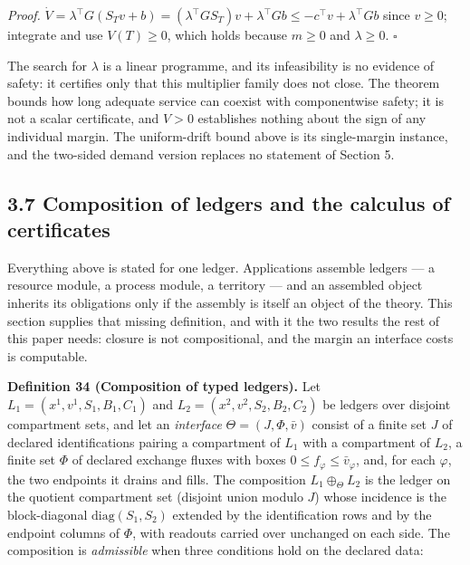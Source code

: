 \documentclass[11pt]{article}
\begin{document}
\emph{Proof.} \(\dot V=\allowbreak{}\lambda^{\top}G(S_Tv+\allowbreak{}b)=\allowbreak{}(\lambda^{\top}GS_T)v+\allowbreak{}\lambda^{\top}Gb\le -c^{\top}v+\allowbreak{}\lambda^{\top}Gb\) since \(v\ge0\); integrate and use \(V(T)\ge0\), which holds because \(m\ge0\) and \(\lambda\ge0\). \(\square\)

The search for \(\lambda\) is a linear programme, and its infeasibility is no evidence of safety: it certifies only that this multiplier family does not close. The theorem bounds how long adequate service can coexist with componentwise safety; it is not a scalar certificate, and \(V>0\) establishes nothing about the sign of any individual margin. The uniform-drift bound above is its single-margin instance, and the two-sided demand version replaces no statement of Section 5.

\vspace{0.8em}

\subsection*{3.7 Composition of ledgers and the calculus of certificates}\label{37-composition-of-ledgers-and-the-calculus-of-certificates}

Everything above is stated for one ledger. Applications assemble ledgers --- a resource module, a process module, a territory --- and an assembled object inherits its obligations only if the assembly is itself an object of the theory. This section supplies that missing definition, and with it the two results the rest of this paper needs: closure is not compositional, and the margin an interface costs is computable.

\textbf{Definition 34 (Composition of typed ledgers).} Let \(L_1 =\allowbreak{} (x^1,\allowbreak{} v^1,\allowbreak{} S_1,\allowbreak{} B_1,\allowbreak{} C_1)\) and \(L_2 =\allowbreak{} (x^2,\allowbreak{} v^2,\allowbreak{} S_2,\allowbreak{} B_2,\allowbreak{} C_2)\) be ledgers over disjoint compartment sets, and let an \emph{interface} \(\Theta = (J, \Phi, \bar v)\) consist of a finite set \(J\) of declared identifications pairing a compartment of \(L_1\) with a compartment of \(L_2\), a finite set \(\Phi\) of declared exchange fluxes with boxes \(0 \le f_\varphi \le \bar v_\varphi\), and, for each \(\varphi\), the two endpoints it drains and fills. The composition \(L_1 \oplus_\Theta L_2\) is the ledger on the quotient compartment set (disjoint union modulo \(J\)) whose incidence is the block-diagonal \(\mathrm{diag}(S_1, S_2)\) extended by the identification rows and by the endpoint columns of \(\Phi\), with readouts carried over unchanged on each side. The composition is \emph{admissible} when three conditions hold on the declared data:
\end{document}
